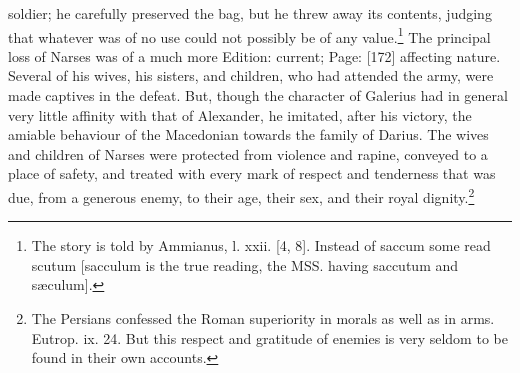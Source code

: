 soldier; he carefully preserved the bag, but he threw away its contents, judging that whatever was of no use could not possibly be of any value.\footnote{The story is told by Ammianus, l. xxii. [4, 8]. Instead of saccum some read scutum [sacculum is the true reading, the MSS. having saccutum and sæculum].} The principal loss of Narses was of a much more Edition: current; Page: [172] affecting nature. Several of his wives, his sisters, and children, who had attended the army, were made captives in the defeat. But, though the character of Galerius had in general very little affinity with that of Alexander, he imitated, after his victory, the amiable behaviour of the Macedonian towards the family of Darius. The wives and children of Narses were protected from violence and rapine, conveyed to a place of safety, and treated with every mark of respect and tenderness that was due, from a generous enemy, to their age, their sex, and their royal dignity.\footnote{The Persians confessed the Roman superiority in morals as well as in arms. Eutrop. ix. 24. But this respect and gratitude of enemies is very seldom to be found in their own accounts.}

